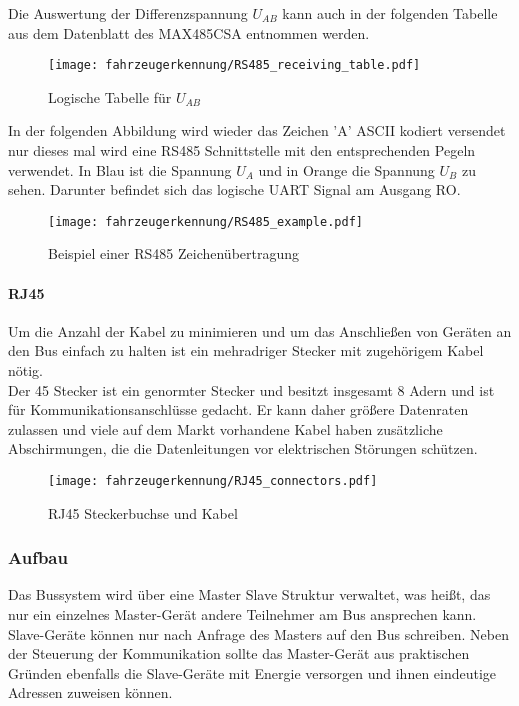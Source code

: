 Die Auswertung der Differenzspannung $U_{AB}$ kann auch in der folgenden Tabelle aus dem Datenblatt des MAX485CSA entnommen werden. 

\begin{figure}[H]
    \centering
    \texttt{[image: fahrzeugerkennung/RS485\_receiving\_table.pdf]}
    \caption{Logische Tabelle für $U_{AB}$}
\end{figure}

In der folgenden Abbildung wird wieder das Zeichen 'A' ASCII kodiert versendet nur dieses mal wird eine RS485 Schnittstelle mit den entsprechenden Pegeln verwendet.
In Blau ist die Spannung $U_{A}$ und in Orange die Spannung $U_{B}$ zu sehen. Darunter befindet sich das logische UART Signal am Ausgang RO. 

\begin{figure}[H]
    \centering
    \texttt{[image: fahrzeugerkennung/RS485\_example.pdf]}
    \caption{Beispiel einer RS485 Zeichenübertragung}
\end{figure}

\paragraph{RJ45}\mbox{}

Um die Anzahl der Kabel zu minimieren und um das Anschließen von Geräten an den Bus einfach zu halten ist ein
mehradriger Stecker mit zugehörigem Kabel nötig.\\
Der 45 Stecker ist ein genormter Stecker und besitzt insgesamt 8 Adern und ist für Kommunikationsanschlüsse gedacht. Er kann daher größere Datenraten zulassen und viele auf dem
Markt vorhandene Kabel haben zusätzliche Abschirmungen, die die Datenleitungen vor elektrischen Störungen schützen. 

\begin{figure}[H]
    \centering
    \texttt{[image: fahrzeugerkennung/RJ45\_connectors.pdf]}
    \caption{RJ45 Steckerbuchse und Kabel}
\end{figure}



\subsubsection{Aufbau}

Das Bussystem wird über eine Master Slave Struktur verwaltet, was heißt, das nur ein einzelnes Master-Gerät andere Teilnehmer am Bus ansprechen kann.
Slave-Geräte können nur nach Anfrage des Masters auf den Bus schreiben. Neben der Steuerung der Kommunikation sollte das Master-Gerät aus praktischen Gründen ebenfalls die Slave-Geräte
mit Energie versorgen und ihnen eindeutige Adressen zuweisen können. \\

